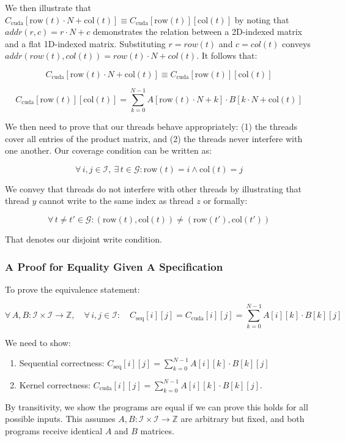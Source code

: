 \documentclass{article}
\begin{document}
We then illustrate that $C_{\text{cuda}}[\text{row}(t) \cdot N + \text{col}(t)] \equiv C_{\text{cuda}}[\text{row}(t)][\text{col}(t)]$ by noting that $addr(r,c) = r \cdot N + c$ demonstrates the relation between a 2D-indexed matrix and a flat 1D-indexed matrix. Substituting $r = row(t)$ and $c = col(t)$ conveys $addr(row(t), col(t)) = row(t) \cdot N + col(t)$. It follows that:

$$C_{\text{cuda}}[\text{row}(t) \cdot N + \text{col}(t)] \equiv C_{\text{cuda}}[\text{row}(t)][\text{col}(t)]$$ 

$$C_{\text{cuda}}[\text{row}(t)][\text{col}(t)] = \sum_{k=0}^{N-1} A[\text{row}(t) \cdot N + k] \cdot B[k \cdot N + \text{col}(t)]$$

We then need to prove that our threads behave appropriately: (1) the threads cover all entries of the product matrix, and (2) the threads never interfere with one another. Our coverage condition can be written as:

$$\forall\, i,j \in \mathcal{I},\ \exists\, t \in \mathcal{G} : \text{row}(t) = i \land \text{col}(t) = j$$

We convey that threads do not interfere with other threads by illustrating that thread $y$ cannot write to the same index as thread $z$ or formally:

$$\forall\, t \neq t' \in \mathcal{G} : (\text{row}(t), \text{col}(t)) \neq (\text{row}(t'), \text{col}(t'))$$

That denotes our disjoint write condition.

\subsubsection{A Proof for Equality Given A Specification}

To prove the equivalence statement:

$$\forall\, A, B : \mathcal{I} \times \mathcal{I} \to \mathbb{Z}, \quad \forall\, i, j \in \mathcal{I}: \quad C_{\text{seq}}[i][j] = C_{\text{cuda}}[i][j] = \sum_{k=0}^{N-1} A[i][k] \cdot B[k][j]$$

We need to show:
\begin{enumerate}
    \item Sequential correctness: $C_{\text{seq}}[i][j] =\sum_{k=0}^{N-1} A[i][k] \cdot B[k][j]$
    \item Kernel correctness: $C_{\text{cuda}}[i][j] =\sum_{k=0}^{N-1} A[i][k] \cdot B[k][j]$. 
\end{enumerate}

By transitivity, we show the programs are equal if we can prove this holds for all possible inputs. This assumes $A, B : \mathcal{I} \times \mathcal{I} \to \mathbb{Z}$ are arbitrary but fixed, and both programs receive identical $A$ and $B$ matrices.
\end{document}
